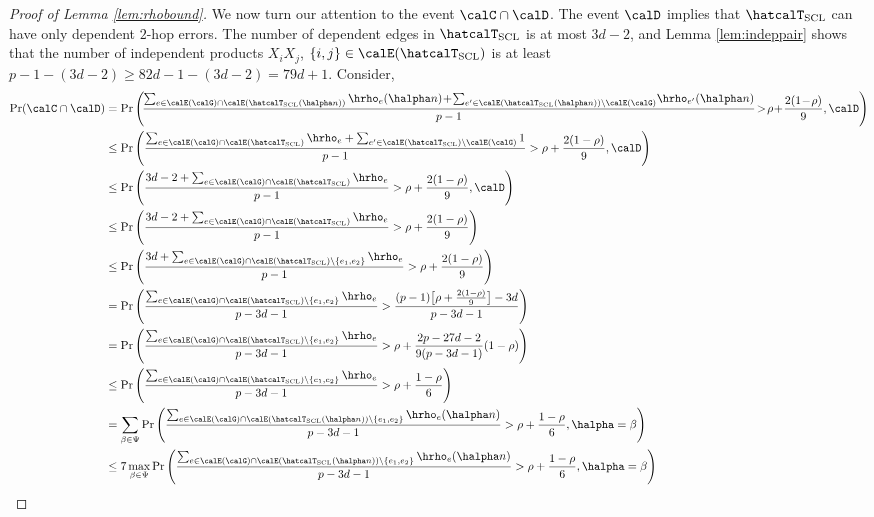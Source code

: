 \documentclass[11pt,onecolumn]{article}
\begin{document}
\begin{proof}[Proof of Lemma \ref{lem:rhobound}]
	We now turn our attention to the event $ \calC\cap \calD$. The event $\calD$ implies that $ \hatcalT_{\rm{SCL}}$ can have only dependent $2$-hop errors. The number
	of dependent edges in $ \hatcalT_{\rm{SCL}}$ is at most $3d-2$, and Lemma \ref{lem:indeppair} shows that the number of independent products $X_{i}X_{j}$, $\{i,j\}\in\calE(\hatcalT_{{\rm SCL}})$ 
	is at least $p-1-(3d-2)\geq 82d-1-(3d-2)=79d+1$. Consider,
	\begin{align}
		\Pr( \calC\cap \calD)&=\Pr\Bigg(\!\frac{\sum_{e\in\calE(\calG)\cap\calE( \hatcalT_{\rm{SCL}}(\halpha n))}\hrho_{e}(\halpha n)\!+\!\sum_{e^{\prime}\in\calE( \hatcalT_{\rm{SCL}}(\halpha n))\backslash\calE(\calG)}\!\hrho_{e^{\prime}}(\halpha n)}{p-1}\!>\!\rho\!+\!\frac{2(1\!-\!\rho)}{9},\calD\Bigg)\\
		&\leq\Pr\Bigg(\frac{\sum_{e\in\calE(\calG)\cap\calE( \hatcalT_{\rm{SCL}})}\hrho_{e}+\sum_{e^{\prime}\in\calE( \hatcalT_{\rm{SCL}})\backslash\calE(\calG)}1}{p-1}>\rho+\frac{2(1-\rho)}{9},\calD\Bigg)\\
		&\leq\Pr\Bigg(\frac{3d-2+\sum_{e\in\calE(\calG)\cap\calE( \hatcalT_{\rm{SCL}})}\hrho_{e}}{p-1}>\rho+\frac{2(1-\rho)}{9},\calD\Bigg)\label{ieq:ieq2}\\
		&\leq\Pr\Bigg(\frac{3d-2+\sum_{e\in\calE(\calG)\cap\calE( \hatcalT_{\rm{SCL}})}\hrho_{e}}{p-1}>\rho+\frac{2(1-\rho)}{9}\Bigg)\\
		&\leq\Pr\Bigg(\frac{3d+\sum_{e\in\calE(\calG)\cap\calE( \hatcalT_{\rm{SCL}})\backslash \{e_{1},e_{2}\}}\hrho_{e}}{p-1}>\rho+\frac{2(1-\rho)}{9}\Bigg)\label{ieq:ieq3}\\
		&=\Pr\Bigg(\frac{\sum_{e\in\calE(\calG)\cap\calE( \hatcalT_{\rm{SCL}})\backslash \{e_{1},e_{2}\}}\hrho_{e}}{p-3d-1}>\frac{(p-1)\big[\rho+\frac{2(1-\rho)}{9}\big]-3d}{p-3d-1}\Bigg)\\
		&=\Pr\Bigg(\frac{\sum_{e\in\calE(\calG)\cap\calE( \hatcalT_{\rm{SCL}})\backslash \{e_{1},e_{2}\}}\hrho_{e}}{p-3d-1}>\rho+\frac{2p-27d-2}{9(p-3d-1)}(1-\rho)\Bigg)\\
		&\leq\Pr\Bigg(\frac{\sum_{e\in\calE(\calG)\cap\calE( \hatcalT_{\rm{SCL}})\backslash \{e_{1},e_{2}\}}\hrho_{e}}{p-3d-1}>\rho+\frac{1-\rho}{6}\Bigg)\label{ieq:ieq5}\\
		&=\sum_{\beta\in\Psi}\Pr\Bigg(\frac{\sum_{e\in\calE(\calG)\cap\calE( \hatcalT_{\rm{SCL}}(\halpha n))\backslash \{e_{1},e_{2}\}}\hrho_{e}(\halpha n)}{p-3d-1}>\rho+\frac{1-\rho}{6},\halpha=\beta\Bigg)\label{eq:ome}\\
		&\leq 7\max_{\beta \in \Psi}\Pr\Bigg(\frac{\sum_{e\in\calE(\calG)\cap\calE( \hatcalT_{\rm{SCL}}(\halpha n))\backslash \{e_{1},e_{2}\}}\hrho_{e}(\halpha n)}{p-3d-1}>\rho+\frac{1-\rho}{6},\halpha=\beta\Bigg)\\

\end{align}
\end{proof}
\end{document}
